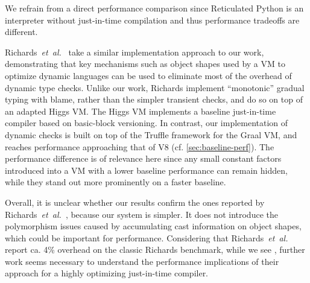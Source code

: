 %
We refrain from a direct performance comparison since
Reticulated Python is an interpreter without just-in-time compilation
and thus performance tradeoffs are different.

Richards~\textit{et~al.}~\cite{Richards2017} take a similar implementation
approach to our work, demonstrating that key mechanisms such as object shapes
used by a VM to optimize dynamic languages can be used to eliminate most of
the overhead of dynamic type checks.
Unlike our work, Richards
implement ``monotonic'' gradual typing with blame, rather than
the simpler transient checks, and do so on top of an adapted Higgs
VM.
The Higgs VM implements a baseline just-in-time compiler based on
basic-block versioning\citep{Chevalier-Boisvert:2016:ITS}.
In contrast, our implementation of dynamic checks
is built on top of the Truffle framework for the Graal VM, and reaches
performance approaching that of V8 (cf. \cref{sec:baseline-perf}).
The performance difference is of relevance here since any small constant factors
introduced into a VM with a lower baseline performance can remain hidden,
while they stand out more prominently on a faster baseline.

Overall, it is unclear whether our results confirm the ones
reported by Richards~\textit{et~al.}~\cite{Richards2017},
because our system is simpler.
It does not introduce the polymorphism
issues caused by accumulating cast information on object shapes,
which could be important for performance.
Considering that Richards~\textit{et~al.} report ca. 4\% overhead
on the classic Richards benchmark, while we see \OverheadRichardsP,
further work seems necessary to understand the performance implications of
their approach for a highly optimizing just-in-time compiler.

